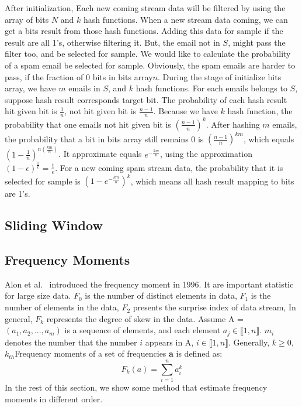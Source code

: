After initialization, Each new coming stream data will be filtered by using the
array of bits $N$ and $k$ hash functions. When a new stream data coming, we can
get a bits result from those hash functions. Adding this data for sample if the
result are all 1's, otherwise filtering it.  But, the email not in $S$, might
pass the filter too, and be selected for sample. We would like to calculate the
probability of a spam email be selected for sample. Obviously, the spam emails
are harder to pass, if the fraction of 0 bits in bits array$n$. During the stage
of initialize bits array, we have $m$ emails in $S$, and $k$ hash functions. For
each emails belongs to $S$, suppose hash result corresponds target bit. The
probability of each hash result hit given bit is $\frac{1}{n}$, not hit given
bit is $\frac{n-1}{n}$. Because we have $k$ hash function, the probability that
one emails not hit given bit is $(\frac{n-1}{n})^k$. After hashing $m$ emails,
the probability that a bit in bits array still remains 0 is
$(\frac{n-1}{n})^{km}$, which equals  $(1-\frac{1}{n})^{n(\frac{km}{n})}$. It
approximate equals $e^{-\frac{km}{n}}$, using the approximation
$(1-\epsilon)^\frac{1}{\epsilon} = \frac{1}{e}$. For a new coming spam stream
data, the probability that it is selected for sample is
$(1-e^{-\frac{km}{n}})^k$, which means all hash result mapping to bits are 1's.

\subsection{Sliding Window}

\subsection{Frequency Moments}
Alon et al.~\cite{alon1999space} introduced the frequency moment in 1996. It are
important statistic for large size data. $F_0$ is the number of distinct
elements in data, $F_1$ is the number of elements in the data, $F_2$ presents
the surprise index of data stream, In general, $F_k$ represents the degree of
skew in the data. Assume A = $(a_1,a_2,...,a_m)$ is a sequence of elements, and
each element $a_j \in \llbracket1, n\rrbracket$. $m_i$ denotes the number that
the number $i$ appears in A, $i \in \llbracket1, n\rrbracket$. Generally,
$k\geqslant0$, $k_{th}$Frequency moments of a set of frequencies \textbf{a} is
defined as: 
\begin{equation*}
F_k(a) = \sum_{i=1}^n a_i^k     
\end{equation*}
In the rest of this section, we show some method that estimate frequency moments
in different order. 


